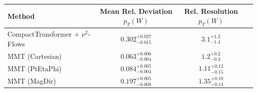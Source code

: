     \begin{tabular}{lccc}
        \toprule
        Method & Mean Rel. Deviation $p_{T}(W)$ & Rel. Resolution $p_{T}(W)$ \\
        \midrule
        CompactTransformer + $\nu^2$-Flows & $0.302^{+0.027}_{-0.015}$ & $3.1^{+1.2}_{-1.4}$ \\
        MMT (Cartesian) & $0.063^{+0.006}_{-0.004}$ & $1.2^{+0.2}_{-0.3}$ \\
        MMT (PtEtaPhi) & $0.084^{+0.005}_{-0.004}$ & $1.11^{+0.12}_{-0.15}$ \\
        MMT (MagDir) & $0.197^{+0.005}_{-0.008}$ & $1.35^{+0.10}_{-0.13}$ \\
        \bottomrule
    \end{tabular}